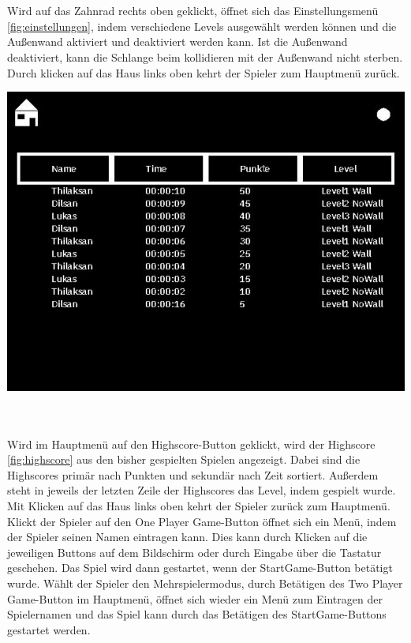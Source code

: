 \newline \\ \\
Wird auf das Zahnrad rechts oben geklickt, {\"o}ffnet sich das Einstellungsmen{\"u} \ref{fig:einstellungen}, indem verschiedene Levels ausgew{\"a}hlt werden k{\"o}nnen und die Au{\ss}enwand aktiviert und deaktiviert werden kann. Ist die Au{\ss}enwand deaktiviert, kann die Schlange beim kollidieren mit der Au{\ss}enwand nicht sterben. Durch klicken auf das Haus links oben kehrt der Spieler zum Hauptmen{\"u} zur{\"u}ck.\newline \newline \\ 
\begin{minipage}[X]{1.1\textwidth}
 \centering
 \includegraphics[scale=0.5]{bilder/Highscore}
 \label{fig:highscore}
\end{minipage}
\newline \\ \\
Wird im Hauptmen{\"u} auf den Highscore-Button geklickt, wird der Highscore \ref{fig:highscore} aus den bisher gespielten Spielen angezeigt. Dabei sind die Highscores prim{\"a}r nach Punkten und sekund{\"a}r nach Zeit sortiert. Au{\ss}erdem steht in jeweils der letzten Zeile der Highscores das Level, indem gespielt wurde. Mit Klicken auf das Haus links oben kehrt der Spieler zur{\"u}ck zum Hauptmen{\"u}.
\\
 Klickt der Spieler auf den \glqq One Player Game\grqq{}-Button {\"o}ffnet sich ein Men{\"u}, indem der Spieler seinen Namen eintragen kann. Dies kann durch Klicken auf die jeweiligen Buttons auf dem Bildschirm oder durch Eingabe {\"u}ber die Tastatur geschehen. Das Spiel wird dann gestartet, wenn der StartGame-Button bet{\"a}tigt wurde. W{\"a}hlt der Spieler den Mehrspielermodus, durch Bet{\"a}tigen des 	\glqq Two Player Game\grqq{}-Button im Hauptmen{\"u}, {\"o}ffnet sich wieder ein Men{\"u} zum Eintragen der Spielernamen und das Spiel kann durch das Bet{\"a}tigen des StartGame-Buttons gestartet werden.  


